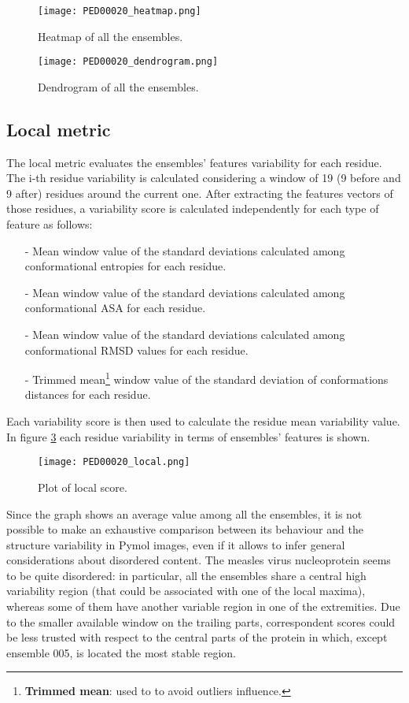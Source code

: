 \begin{figure}[H]
    \centering
	\texttt{[image: PED00020\_heatmap.png]}
	\caption{Heatmap of all the ensembles.}
	\label{heatmap}
\end{figure}
\begin{figure}[H]
    \centering
	\texttt{[image: PED00020\_dendrogram.png]}
	\caption{Dendrogram of all the ensembles.}
	\label{dendrogram}
\end{figure}


\subsection{Local metric}
The local metric evaluates the ensembles' features variability for each residue.
The i-th residue variability is calculated considering a window of 19 (9 before and 9 after) residues around the current one. After extracting the features vectors of those residues, a variability score is calculated independently for each type of feature as follows:

\begin{itemize}
\item[-] Mean window value of the standard deviations calculated among conformational entropies for each residue.
\item[-] Mean window value of the standard deviations calculated among conformational ASA for each residue.
\item[-] Mean window value of the standard deviations calculated among conformational RMSD values for each residue.
\item[-] Trimmed mean\footnote{\textbf{Trimmed mean}: used to to avoid outliers influence.} window value of the standard deviation of conformations distances for each residue.
\end{itemize}

Each variability score is then used to calculate the residue mean variability value. In figure \ref{plot} each residue variability in terms of ensembles' features is shown.

\begin{figure}[H]
    \centering
	\texttt{[image: PED00020\_local.png]}
	\caption{Plot of local score.}
	\label{plot}
\end{figure}

Since the graph shows an average value among all the ensembles, it is not possible to make an exhaustive comparison between its behaviour and the structure variability in Pymol images, even if it allows to infer general considerations about disordered content. The measles virus nucleoprotein seems to be quite disordered: in particular, all the ensembles share a central high variability region (that could be associated with one of the local maxima), whereas some of them have another variable region in one of the extremities. Due to the smaller available window on the trailing parts, correspondent scores could be less trusted with respect to the central parts of the protein in which, except ensemble 005, is located the most stable region.

